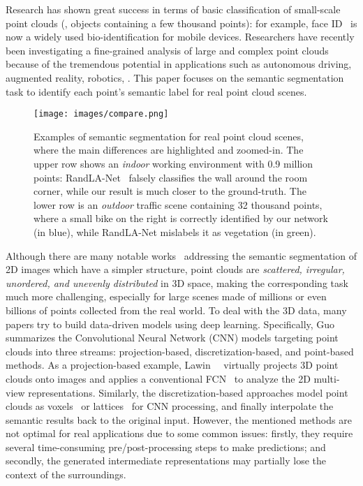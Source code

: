 \documentclass[10pt,twocolumn,letterpaper]{article}
\begin{document}
Research has shown great success in terms of basic classification of small-scale point clouds (\ie, objects containing a few thousand points): for example, face ID~\cite{hamza2008face} is now a widely used bio-identification for mobile devices. Researchers have recently been investigating a fine-grained analysis of large and complex point clouds~\cite{thomas2019kpconv, landrieu2018large, hu2020randla, xie2020pointcontrast} because of the tremendous potential in applications such as autonomous driving, augmented reality, robotics, \etc. This paper focuses on the semantic segmentation task to identify each point's semantic label for real point cloud scenes.

\begin{figure}
\begin{center}
\texttt{[image: images/compare.png]}
\end{center}
\vspace{-5mm}
\captionsetup{font=small}
\caption{Examples of semantic segmentation for real point cloud scenes, where the main differences are highlighted and zoomed-in. The upper row shows an \emph{indoor} working environment with 0.9 million points: RandLA-Net~\cite{hu2020randla} falsely classifies the wall around the room corner, while our result is much closer to the ground-truth. The lower row is an \emph{outdoor} traffic scene containing 32 thousand points, where a small bike on the right is correctly identified by our network (in blue), while RandLA-Net mislabels it as vegetation (in green).}
\label{fig:compare}
\vspace{-5mm}
\end{figure}
Although there are many notable works~\cite{ronneberger2015u, long2015fully, zhao2017pyramid} addressing the semantic segmentation of 2D images which have a simpler structure, point clouds are \emph{scattered, irregular, unordered, and unevenly distributed} in 3D space, making the corresponding task much more challenging, especially for large scenes made of millions or even billions of points collected from the real world. To deal with the 3D data, many papers try to build data-driven models using deep learning. Specifically, Guo~\etal~\cite{guo2020deep} summarizes the Convolutional Neural Network (CNN) models targeting point clouds into three streams: projection-based, discretization-based, and point-based methods. As a projection-based example, Lawin~\etal~\cite{lawin2017deep} virtually projects 3D point clouds onto images and applies a conventional FCN~\cite{long2015fully} to analyze the 2D multi-view representations. Similarly, the discretization-based approaches model point clouds as voxels~\cite{huang2016point} or lattices~\cite{su2018splatnet} for CNN processing, and finally interpolate the semantic results back to the original input. However, the mentioned methods are not optimal for real applications due to some common issues: firstly, they require several time-consuming pre/post-processing steps to make predictions; and secondly, the generated intermediate representations may partially lose the context of the surroundings. 
\end{document}
